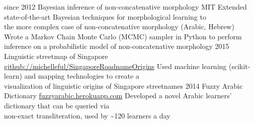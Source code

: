 \documentclass[]{friggeri-cv}
\begin{document}
\begin{entrylist}
  \entry
    {since 2012}
    {Bayesian inference of non-concatenative morphology}
    {MIT}
    {\Squaredot Extended state-of-the-art Bayesian techniques for morphological learning to \\
    \hspace*{3pt} the more complex case of non-concatenative morphology (Arabic, Hebrew) \\
    \Squaredot Wrote a Markov Chain Monte Carlo (MCMC) sampler in Python to perform \\
    \hspace*{3pt} inference on a probabilistic model of non-concatenative morphology}
  \entry
    {2015}
    {Linguistic streetmap of Singapore}
    {\href{https://github.com/michelleful/SingaporeRoadnameOrigins}{github://michelleful/SingaporeRoadnameOrigins}}
    {\Squaredot Used machine learning (scikit-learn) and mapping technologies to create a \\
     \hspace*{3pt} visualization of linguistic origins of Singapore streetnames
    }
  \entry
    {2014}
    {Fuzzy Arabic Dictionary}
    {\href{http://fuzzyarabic.herokuapp.com}{fuzzyarabic.herokuapp.com}}
    {
    \Squaredot Developed a novel Arabic learners' dictionary that can be queried via \\
    \hspace*{3pt} non-exact transliteration, used by \textasciitilde 120 learners a day}
\end{entrylist}
\end{document}
